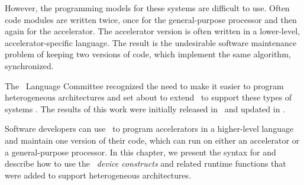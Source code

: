 However, the programming models for these systems are difficult to use.
Often code modules are written twice, once for the general-purpose
processor and then again for the accelerator.  The accelerator version is often
written in a lower-level, accelerator-specific language.  The result is the
undesirable software maintenance problem of keeping two versions of code, which
implement the same algorithm, synchronized.

The \OMP\ Language Committee recognized the need to make it easier to program
heterogeneous architectures and set about to extend \OMP\ to support these types
of systems \cite{Beyer2011}.  The results of this work were initially released
in \OMPfourzero\ and updated in \OMPfourfive.

Software developers can use \OMP\ to program accelerators in a higher-level
language and maintain one version of their code, which can run on either an
accelerator or a general-purpose processor.  In this chapter, we present the
syntax for and describe how to use the \OMP\ \emph{device constructs} and
related runtime functions that were added to support heterogeneous
architectures. 



